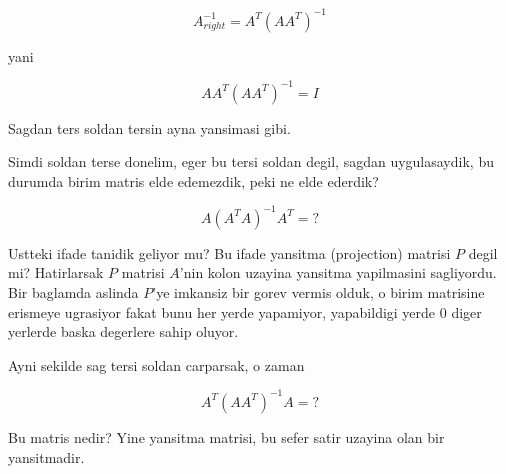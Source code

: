 \documentclass[12pt,fleqn]{article}\usepackage{../common}
\begin{document}
$$ A_{right}^{-1} = A^T(AA^T)^{-1} $$

yani 

$$ A A^T(AA^T)^{-1} = I$$

Sagdan ters soldan tersin ayna yansimasi gibi. 

Simdi soldan terse donelim, eger bu tersi soldan degil, sagdan
uygulasaydik, bu durumda birim matris elde edemezdik, peki ne elde ederdik?


$$ A (A^TA)^{-1} A^T = ?$$

Ustteki ifade tanidik geliyor mu? Bu ifade yansitma (projection) matrisi
$P$ degil mi? Hatirlarsak $P$ matrisi $A$'nin kolon uzayina yansitma
yapilmasini sagliyordu. Bir baglamda aslinda $P$'ye imkansiz bir gorev
vermis olduk, o birim matrisine erismeye ugrasiyor fakat bunu her yerde
yapamiyor, yapabildigi yerde 0 diger yerlerde baska degerlere sahip
oluyor. 

Ayni sekilde sag tersi soldan carparsak, o zaman 

$$ A^T (AA^T)^{-1}A = ?$$

Bu matris nedir? Yine yansitma matrisi, bu sefer satir uzayina olan bir
yansitmadir. 
\end{document}
